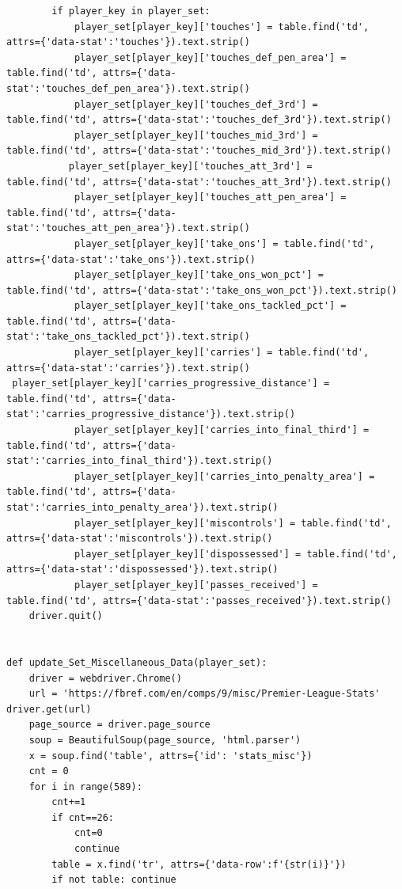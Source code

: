\documentclass[12pt]{report}
\begin{document}
{\begin{lstlisting}
        if player_key in player_set:
            player_set[player_key]['touches'] = table.find('td', attrs={'data-stat':'touches'}).text.strip()
            player_set[player_key]['touches_def_pen_area'] = table.find('td', attrs={'data-stat':'touches_def_pen_area'}).text.strip()
            player_set[player_key]['touches_def_3rd'] = table.find('td', attrs={'data-stat':'touches_def_3rd'}).text.strip()
            player_set[player_key]['touches_mid_3rd'] = table.find('td', attrs={'data-stat':'touches_mid_3rd'}).text.strip()
           player_set[player_key]['touches_att_3rd'] = table.find('td', attrs={'data-stat':'touches_att_3rd'}).text.strip()
            player_set[player_key]['touches_att_pen_area'] = table.find('td', attrs={'data-stat':'touches_att_pen_area'}).text.strip()
            player_set[player_key]['take_ons'] = table.find('td', attrs={'data-stat':'take_ons'}).text.strip()
            player_set[player_key]['take_ons_won_pct'] = table.find('td', attrs={'data-stat':'take_ons_won_pct'}).text.strip()
            player_set[player_key]['take_ons_tackled_pct'] = table.find('td', attrs={'data-stat':'take_ons_tackled_pct'}).text.strip()
            player_set[player_key]['carries'] = table.find('td', attrs={'data-stat':'carries'}).text.strip()
 player_set[player_key]['carries_progressive_distance'] = table.find('td', attrs={'data-stat':'carries_progressive_distance'}).text.strip()
            player_set[player_key]['carries_into_final_third'] = table.find('td', attrs={'data-stat':'carries_into_final_third'}).text.strip()
            player_set[player_key]['carries_into_penalty_area'] = table.find('td', attrs={'data-stat':'carries_into_penalty_area'}).text.strip()
            player_set[player_key]['miscontrols'] = table.find('td', attrs={'data-stat':'miscontrols'}).text.strip()
            player_set[player_key]['dispossessed'] = table.find('td', attrs={'data-stat':'dispossessed'}).text.strip()
            player_set[player_key]['passes_received'] = table.find('td', attrs={'data-stat':'passes_received'}).text.strip()
    driver.quit()


def update_Set_Miscellaneous_Data(player_set):
    driver = webdriver.Chrome()
    url = 'https://fbref.com/en/comps/9/misc/Premier-League-Stats'
driver.get(url)
    page_source = driver.page_source
    soup = BeautifulSoup(page_source, 'html.parser')
    x = soup.find('table', attrs={'id': 'stats_misc'})
    cnt = 0
    for i in range(589):
        cnt+=1
        if cnt==26:
            cnt=0
            continue
        table = x.find('tr', attrs={'data-row':f'{str(i)}'})
        if not table: continue


\end{lstlisting}}
\end{document}
